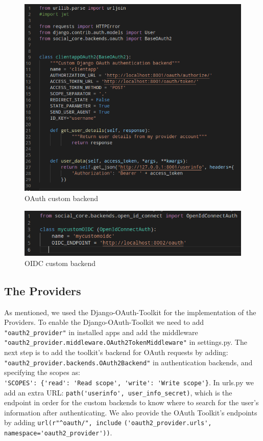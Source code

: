 \begin{figure}[htb]
	\centering
	\includegraphics[scale=0.6]{figures/clientapp.png}
	\caption{OAuth custom backend}\label{oauth-backend}
\end{figure}


\begin{figure}[htb]
	\centering
	\includegraphics[scale=0.6]{figures/customOIDC.png}
	\caption{OIDC custom backend}\label{oidc-backend}
\end{figure}


\subsection{The Providers}

As mentioned, we used the Django-OAuth-Toolkit for the implementation of the Providers. To enable the Django-OAuth-Toolkit we need to add \verb|"oauth2_provider"| in installed apps and add the middleware \verb|"oauth2_provider.middleware.OAuth2TokenMiddleware"| in settings.py. The next step is to add the toolkit's backend for OAuth requests by adding:\linebreak
\verb|"oauth2_provider.backends.OAuth2Backend"| in authentication backends, and specifying the scopes as:\\
\verb|'SCOPES': {'read': 'Read scope', 'write': 'Write scope'}|.
In urls.py we add an extra URL: \verb|path('userinfo', user_info_secret)|, which is the endpoint in order for the custom backends to know where to search for the user's information after authenticating. We also provide the OAuth Toolkit's endpoints by adding \verb|url(r"^oauth/", include| \verb|('oauth2_provider.urls', namespace='oauth2_provider'))|.


